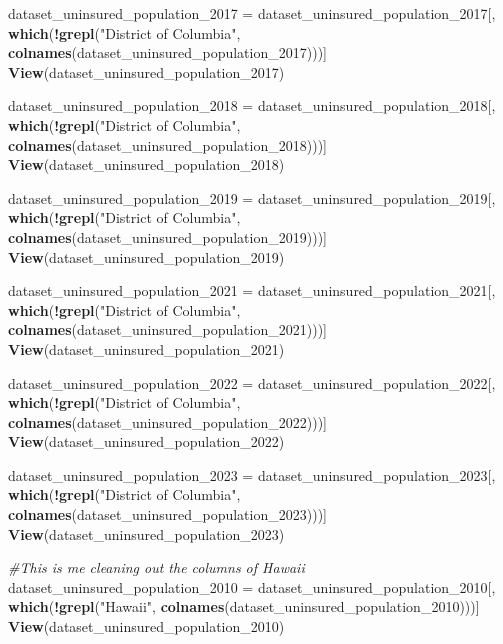 \documentclass[
]{article}
\newenvironment{Shaded}{\begin{snugshade}}{\end{snugshade}}
\newcommand{\CommentTok}[1]{\textcolor[rgb]{0.56,0.35,0.01}{\textit{#1}}}
\newcommand{\FunctionTok}[1]{\textcolor[rgb]{0.13,0.29,0.53}{\textbf{#1}}}
\newcommand{\NormalTok}[1]{#1}
\newcommand{\OtherTok}[1]{\textcolor[rgb]{0.56,0.35,0.01}{#1}}
\newcommand{\SpecialCharTok}[1]{\textcolor[rgb]{0.81,0.36,0.00}{\textbf{#1}}}
\newcommand{\StringTok}[1]{\textcolor[rgb]{0.31,0.60,0.02}{#1}}
\begin{document}
\begin{Shaded}
\begin{Highlighting}[]
\NormalTok{dataset\_uninsured\_population\_2017 }\OtherTok{=}\NormalTok{ dataset\_uninsured\_population\_2017[, }\FunctionTok{which}\NormalTok{(}\SpecialCharTok{!}\FunctionTok{grepl}\NormalTok{(}\StringTok{"District of Columbia"}\NormalTok{, }\FunctionTok{colnames}\NormalTok{(dataset\_uninsured\_population\_2017)))]}
\FunctionTok{View}\NormalTok{(dataset\_uninsured\_population\_2017)}

\NormalTok{dataset\_uninsured\_population\_2018 }\OtherTok{=}\NormalTok{ dataset\_uninsured\_population\_2018[, }\FunctionTok{which}\NormalTok{(}\SpecialCharTok{!}\FunctionTok{grepl}\NormalTok{(}\StringTok{"District of Columbia"}\NormalTok{, }\FunctionTok{colnames}\NormalTok{(dataset\_uninsured\_population\_2018)))]}
\FunctionTok{View}\NormalTok{(dataset\_uninsured\_population\_2018)}

\NormalTok{dataset\_uninsured\_population\_2019 }\OtherTok{=}\NormalTok{ dataset\_uninsured\_population\_2019[, }\FunctionTok{which}\NormalTok{(}\SpecialCharTok{!}\FunctionTok{grepl}\NormalTok{(}\StringTok{"District of Columbia"}\NormalTok{, }\FunctionTok{colnames}\NormalTok{(dataset\_uninsured\_population\_2019)))]}
\FunctionTok{View}\NormalTok{(dataset\_uninsured\_population\_2019)}

\NormalTok{dataset\_uninsured\_population\_2021 }\OtherTok{=}\NormalTok{ dataset\_uninsured\_population\_2021[, }\FunctionTok{which}\NormalTok{(}\SpecialCharTok{!}\FunctionTok{grepl}\NormalTok{(}\StringTok{"District of Columbia"}\NormalTok{, }\FunctionTok{colnames}\NormalTok{(dataset\_uninsured\_population\_2021)))]}
\FunctionTok{View}\NormalTok{(dataset\_uninsured\_population\_2021)}

\NormalTok{dataset\_uninsured\_population\_2022 }\OtherTok{=}\NormalTok{ dataset\_uninsured\_population\_2022[, }\FunctionTok{which}\NormalTok{(}\SpecialCharTok{!}\FunctionTok{grepl}\NormalTok{(}\StringTok{"District of Columbia"}\NormalTok{, }\FunctionTok{colnames}\NormalTok{(dataset\_uninsured\_population\_2022)))]}
\FunctionTok{View}\NormalTok{(dataset\_uninsured\_population\_2022)}

\NormalTok{dataset\_uninsured\_population\_2023 }\OtherTok{=}\NormalTok{ dataset\_uninsured\_population\_2023[, }\FunctionTok{which}\NormalTok{(}\SpecialCharTok{!}\FunctionTok{grepl}\NormalTok{(}\StringTok{"District of Columbia"}\NormalTok{, }\FunctionTok{colnames}\NormalTok{(dataset\_uninsured\_population\_2023)))]}
\FunctionTok{View}\NormalTok{(dataset\_uninsured\_population\_2023)}

\CommentTok{\#This is me cleaning out the columns of Hawaii}
\NormalTok{dataset\_uninsured\_population\_2010 }\OtherTok{=}\NormalTok{ dataset\_uninsured\_population\_2010[, }\FunctionTok{which}\NormalTok{(}\SpecialCharTok{!}\FunctionTok{grepl}\NormalTok{(}\StringTok{"Hawaii"}\NormalTok{, }\FunctionTok{colnames}\NormalTok{(dataset\_uninsured\_population\_2010)))]}
\FunctionTok{View}\NormalTok{(dataset\_uninsured\_population\_2010)}


\end{Highlighting}
\end{Shaded}
\end{document}

